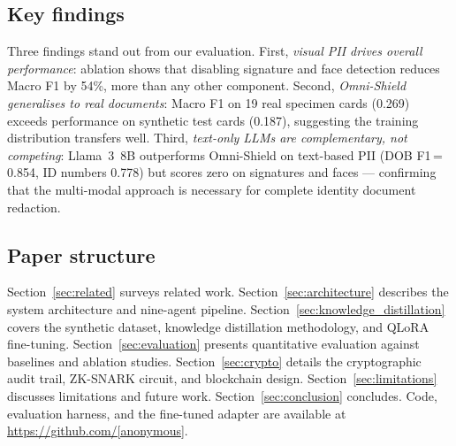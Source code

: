 \subsection*{Key findings}

Three findings stand out from our evaluation.
First, \emph{visual PII drives overall performance}:
ablation shows that disabling signature and face detection
reduces Macro F1 by 54\%, more than any other component.
Second, \emph{Omni-Shield generalises to real documents}:
Macro F1 on 19 real specimen cards (0.269) exceeds
performance on synthetic test cards (0.187), suggesting
the training distribution transfers well.
Third, \emph{text-only LLMs are complementary, not
competing}: Llama~3~8B outperforms Omni-Shield on
text-based PII (DOB F1\,=\,0.854, ID numbers 0.778)
but scores zero on signatures and faces --- confirming
that the multi-modal approach is necessary for complete
identity document redaction.

\subsection*{Paper structure}

Section~\ref{sec:related} surveys related work.
Section~\ref{sec:architecture} describes the system
architecture and nine-agent pipeline.
Section~\ref{sec:knowledge_distillation} covers the
synthetic dataset, knowledge distillation methodology,
and QLoRA fine-tuning.
Section~\ref{sec:evaluation} presents quantitative
evaluation against baselines and ablation studies.
Section~\ref{sec:crypto} details the cryptographic
audit trail, ZK-SNARK circuit, and blockchain design.
Section~\ref{sec:limitations} discusses limitations
and future work.
Section~\ref{sec:conclusion} concludes.
Code, evaluation harness, and the fine-tuned adapter
are available at \url{https://github.com/[anonymous]}.
